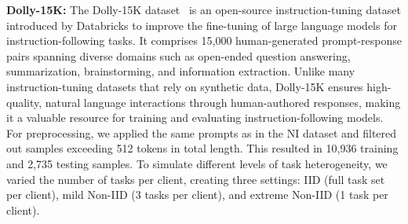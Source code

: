 \documentclass[sigconf]{acmart}
\newcommand*\circled[1]{\tikz[baseline=(char.base)]{
            \node[shape=circle,draw,inner sep=0.4pt] (char) {#1};}}
\begin{document}

\circled{2} \textbf{Dolly-15K:} The Dolly-15K dataset~\cite{conover2023free} is an open-source instruction-tuning dataset introduced by Databricks to improve the fine-tuning of large language models for instruction-following tasks. It comprises 15,000 human-generated prompt-response pairs spanning diverse domains such as open-ended question answering, summarization, brainstorming, and information extraction. Unlike many instruction-tuning datasets that rely on synthetic data, Dolly-15K ensures high-quality, natural language interactions through human-authored responses, making it a valuable resource for training and evaluating instruction-following models.
For preprocessing, we applied the same prompts as in the NI dataset and filtered out samples exceeding 512 tokens in total length. This resulted in 10,936 training and 2,735 testing samples. To simulate different levels of task heterogeneity, we varied the number of tasks per client, creating three settings: IID (full task set per client), mild Non-IID (3 tasks per client), and extreme Non-IID (1 task per client).
\end{document}
